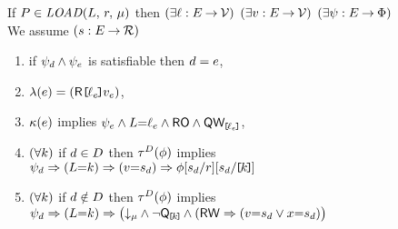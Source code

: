 \begin{figure*}
\begin{center}
\begin{minipage}{0.88\textwidth}

  \noindent
  If $\aPS \in \sLOAD[\amode]{\cExp}{\aReg}$ then
  $(\exists\cVal:\aEvs\fun\Val)$
  $(\exists\aVal:\aEvs\fun\Val)$
  $(\exists\bForm:\aEvs\fun\Formulae)$
  We assume $(\bReg:\aEvs\fun\Reg)$
  \begin{enumerate}
  \item if $\bForm_\bEv\land\bForm_\aEv$ is satisfiable then $\bEv=\aEv$,
  \item $\labelingAct(\aEv) = \DRREFP{\cVal_\aEv}{\aVal_\aEv}$,
  \item $\labelingForm(\aEv)$ implies
    \begin{math}
      \bForm_\aEv
      \land \cExp{=}\cVal_\aEv
      \land \RO
      \land \QwREF{\cVal_\aEv}
    \end{math},
  \item
    \begin{math}
      (\forall\dVal)
    \end{math}
    if $\bEv\in\bEvs$ then
    $\aTr[\bEvs](\aForm)$ implies
    \begin{math}
      \bForm_\bEv
      \limplies (\cExp{=}\dVal)
      \limplies (\aVal{=}\bReg_\bEv)
      \limplies \aForm[\bReg_\bEv/\aReg][\bReg_\bEv/\REF{\dVal}]
    \end{math}
    \makebox[4.4cm]{}
  \item 
    \begin{math}
      (\forall\dVal)
    \end{math}
    if $\bEv\notin\bEvs$ then
    $\aTr[\bEvs](\aForm)$ implies
    \begin{math}
      \bForm_\bEv
      \limplies (\cExp{=}\dVal)
      \limplies \PBRbig{        
        \Dmode{\amode}
        \land \lnot\QxREF{\dVal}
        \land
        (\RW
         \limplies (\aVal{=}\bReg_\bEv\lor\aLoc{=}\bReg_\bEv) 
}
\end{math}
\end{enumerate}
\end{minipage}
\end{center}
\end{figure*}
